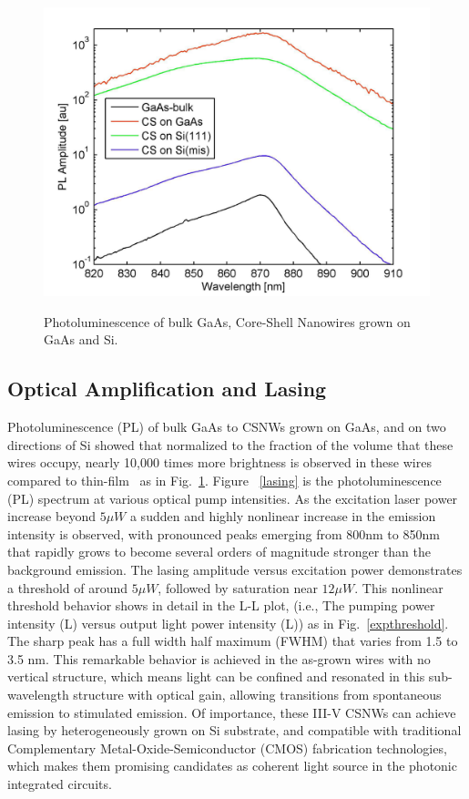 \begin{figure}
  \caption{Photoluminescence of bulk GaAs, Core-Shell Nanowires grown on GaAs and Si.}
  \centering
  \includegraphics[width=\textwidth]{pictures/Data/PL}
  \label{PL}
\end{figure}

\subsection{Optical Amplification and Lasing} \label{data_lasing}

Photoluminescence (PL) of bulk GaAs to CSNWs grown on GaAs, and on two
directions of Si showed that normalized to the fraction of the volume that
these wires occupy, nearly 10,000 times more brightness is observed in these
wires compared to thin-film~\cite{Wang:2015bz} as in Fig.~\ref{PL}.  Figure
~\ref{lasing} is the photoluminescence (PL) spectrum at various optical pump
intensities. As the excitation laser power increase beyond $5{\mu}W$ a sudden
and highly nonlinear increase in the emission intensity is observed, with
pronounced peaks emerging from 800nm to 850nm that rapidly grows to become
several orders of magnitude stronger than the background emission. The lasing
amplitude versus excitation power demonstrates a threshold of around $5{\mu}W$,
followed by saturation near $12{\mu}W$. This nonlinear threshold behavior shows
in detail in the L-L plot, (i.e., The pumping power intensity (L) versus output
light power intensity (L)) as in Fig.~\ref{expthreshold}. The sharp peak has a
full width half maximum (FWHM) that varies from 1.5 to 3.5 nm. This remarkable
behavior is achieved in the as-grown wires with no vertical structure, which
means light can be confined and resonated in this sub-wavelength structure with
optical gain, allowing transitions from spontaneous emission to stimulated
emission. Of importance, these III-V CSNWs can achieve lasing by
heterogeneously grown on Si substrate, and compatible with traditional
Complementary Metal-Oxide-Semiconductor (CMOS) fabrication technologies, which
makes them promising candidates as coherent light source in the photonic
integrated circuits.

